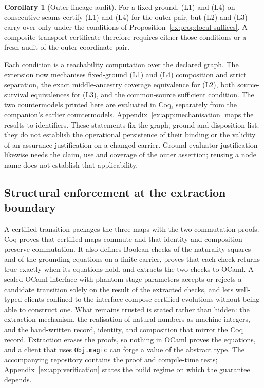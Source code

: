 \documentclass[11pt]{article}
\theoremstyle{definition}
\newtheorem{corollary}[proposition]{Corollary}
\newcommand{\code}[1]{\texttt{#1}}
\begin{document}
\begin{corollary}[Outer lineage audit]\label{ex:cor:fresh-outer-audit}
For a fixed ground, (L1) and (L4) on consecutive seams certify (L1) and (L4) for the outer pair, but (L2) and (L3) carry over only under the conditions of Proposition~\ref{ex:prop:local-suffices}. A composite transport certificate therefore requires either those conditions or a fresh audit of the outer coordinate pair.
\end{corollary}

Each condition is a reachability computation over the declared graph. The extension now mechanises fixed-ground (L1) and (L4) composition and strict separation, the exact middle-ancestry coverage equivalence for (L2), both source-survival equivalences for (L3), and the common-source sufficient condition. The two countermodels printed here are evaluated in Coq, separately from the companion's earlier countermodels. Appendix~\ref{ex:app:mechanisation} maps the results to identifiers. These statements fix the graph, ground and disposition list; they do not establish the operational persistence of their binding or the validity of an assurance justification on a changed carrier. Ground-evaluator justification likewise needs the claim, use and coverage of the outer assertion; reusing a node name does not establish that applicability.

\subsection{Structural enforcement at the extraction boundary}\label{ex:sec:structural-enforcement}

A certified transition packages the three maps with the two commutation proofs. Coq proves that certified maps commute and that identity and composition preserve commutation. It also defines Boolean checks of the naturality squares and of the grounding equations on a finite carrier, proves that each check returns true exactly when its equations hold, and extracts the two checks to OCaml. A sealed OCaml interface with phantom stage parameters accepts or rejects a candidate transition solely on the result of the extracted checks, and lets well-typed clients confined to the interface compose certified evolutions without being able to construct one. What remains trusted is stated rather than hidden: the extraction mechanism, the realisation of natural numbers as machine integers, and the hand-written record, identity, and composition that mirror the Coq record. Extraction erases the proofs, so nothing in OCaml proves the equations, and a client that uses \code{Obj.magic} can forge a value of the abstract type. The accompanying repository contains the proof and compile-time tests; Appendix~\ref{ex:app:verification} states the build regime on which the guarantee depends.
\end{document}
